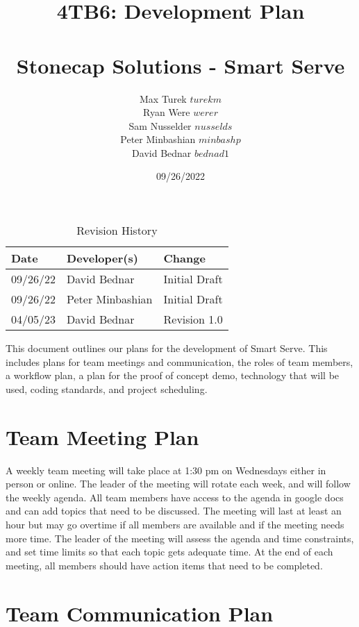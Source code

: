 \documentclass{article}
\title{%
\textbf{4TB6: Development Plan\\\progname}\\
\addlinespace
\addlinespace
\addlinespace
\addlinespace
\large \textbf{Stonecap Solutions - Smart Serve}
\addlinespace
\addlinespace
\addlinespace
\addlinespace}
\author{Max Turek $turekm$\\Ryan Were $werer$\\Sam Nusselder $nusselds$\\Peter Minbashian $minbashp$\\David Bednar $bednad1$}
\date{09/26/2022}
\begin{document}
\maketitle
\newpage
\tableofcontents
\addlinespace
\addlinespace
\addlinespace
\addlinespace

\begin{table}[hp]
\caption{Revision History} \label{TblRevisionHistory}
\begin{tabularx}{\textwidth}{llX}
\toprule
\textbf{Date} & \textbf{Developer(s)} & \textbf{Change}\\
\midrule
09/26/22 & David Bednar & Initial Draft\\
09/26/22 & Peter Minbashian & Initial Draft \\
\bottomrule
\toprule
04/05/23 & David Bednar & Revision 1.0 \\
\bottomrule
\end{tabularx}
\end{table}

\newpage

\maketitle

This document outlines our plans for the development of Smart Serve. This includes plans for team meetings and communication, the roles of team members, a workflow plan, a plan for the proof of concept demo, technology that will be used, coding standards, and project scheduling.

\section{Team Meeting Plan}

A weekly team meeting will take place at 1:30 pm on Wednesdays either in person or online. The leader of the meeting will rotate each week, and will follow the weekly agenda. All team members have access to the agenda in google docs and can add topics that need to be discussed. The meeting will last at least an hour but may go overtime if all members are available and if the meeting needs more time. The leader of the meeting will assess the agenda and time constraints, and set time limits so that each topic gets adequate time. At the end of each meeting, all members should have action items that need to be completed.

\section{Team Communication Plan}
\end{document}
